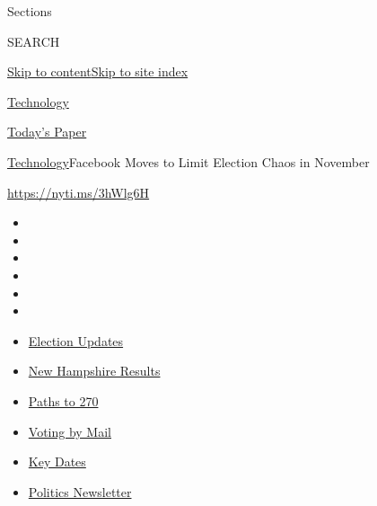 Sections

SEARCH

\protect\hyperlink{site-content}{Skip to
content}\protect\hyperlink{site-index}{Skip to site index}

\href{https://www.nytimes3xbfgragh.onion/section/technology}{Technology}

\href{https://myaccount.nytimes3xbfgragh.onion/auth/login?response_type=cookie\&client_id=vi}{}

\href{https://www.nytimes3xbfgragh.onion/section/todayspaper}{Today's
Paper}

\href{/section/technology}{Technology}\textbar{}Facebook Moves to Limit
Election Chaos in November

\url{https://nyti.ms/3hWlg6H}

\begin{itemize}
\item
\item
\item
\item
\item
\item
\end{itemize}

\begin{itemize}
\item
  \href{https://www.nytimes3xbfgragh.onion/live/2020/09/09/us/trump-vs-biden?action=click\&pgtype=Article\&state=default\&region=TOP_BANNER\&context=storylines_menu}{Election
  Updates}
\item
  \href{https://www.nytimes3xbfgragh.onion/interactive/2020/09/08/us/elections/results-new-hampshire-primary-elections.html?action=click\&pgtype=Article\&state=default\&region=TOP_BANNER\&context=storylines_menu}{New
  Hampshire Results}
\item
  \href{https://www.nytimes3xbfgragh.onion/interactive/2020/us/elections/election-states-biden-trump.html?action=click\&pgtype=Article\&state=default\&region=TOP_BANNER\&context=storylines_menu}{Paths
  to 270}
\item
  \href{https://www.nytimes3xbfgragh.onion/interactive/2020/08/31/us/politics/vote-by-mail-deadlines.html?action=click\&pgtype=Article\&state=default\&region=TOP_BANNER\&context=storylines_menu}{Voting
  by Mail}
\item
  \href{https://www.nytimes3xbfgragh.onion/interactive/2019/us/elections/2020-presidential-election-calendar.html?action=click\&pgtype=Article\&state=default\&region=TOP_BANNER\&context=storylines_menu}{Key
  Dates}
\item
  \href{https://www.nytimes3xbfgragh.onion/newsletters/politics?action=click\&pgtype=Article\&state=default\&region=TOP_BANNER\&context=storylines_menu}{Politics
  Newsletter}
\end{itemize}

